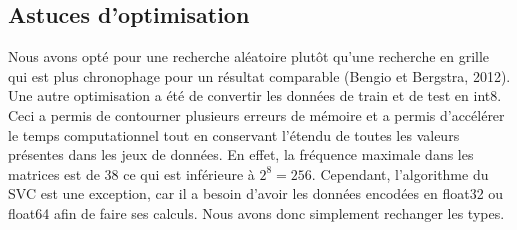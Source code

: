 \documentclass{article}
\begin{document}
\subsection{Astuces d'optimisation}
Nous avons opté pour une recherche aléatoire plutôt qu'une recherche en grille qui est plus chronophage pour un résultat comparable (Bengio et Bergstra, 2012). Une autre optimisation a été de convertir les données de train et de test en int8. Ceci a permis de contourner plusieurs erreurs de mémoire et a permis d'accélérer le temps computationnel tout en conservant l'étendu de toutes les valeurs présentes dans les jeux de données. En effet, la fréquence maximale dans les matrices est de 38 ce qui est inférieure à $2^8=256$. Cependant, l'algorithme du SVC est une exception, car il a besoin d'avoir les données encodées en float32 ou float64 afin de faire ses calculs. Nous avons donc simplement rechanger les types.
\end{document}
